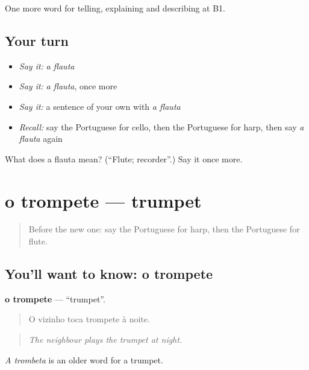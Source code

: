 \begin{grammarlens}[title={What you've built}]
One more word for telling, explaining and describing at B1.
\end{grammarlens}

\subsection*{Your turn}
\begin{itemize}
\raggedright
  \item \emph{Say it:} \emph{a flauta}
  \item \emph{Say it:} \emph{a flauta}, once more
  \item \emph{Say it:} a sentence of your own with \emph{a flauta}
  \item \emph{Recall:} say the Portuguese for cello, then the Portuguese for harp, then say \emph{a flauta} again
\end{itemize}

\begin{tcolorbox}[breakable,colback=teal!4,colframe=teal!35!black,title={Before you move on}]
What does a flauta mean? (\textquotedblleft{}Flute; recorder\textquotedblright{}.) Say it once more.
\end{tcolorbox}
\section[o trompete]{o trompete — trumpet}

\label{lesson:PT-C517-trompete}



\begin{quote}
Before the new one: say the Portuguese for harp, then the Portuguese for flute.
\end{quote}

\subsection*{You'll want to know: o trompete}
\textbf{o trompete} — \textquotedblleft{}trumpet\textquotedblright{}.

\begin{quote}
O vizinho toca trompete à noite.
\end{quote}

\begin{quote}
\emph{The neighbour plays the trumpet at night.}
\end{quote}

\emph{A trombeta} is an older word for a trumpet.

